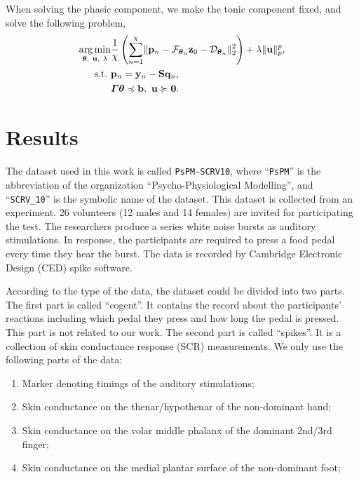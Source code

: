 \documentclass[10pt,conference]{ieeeconf}
\DeclareMathOperator*{\argmin}{arg\,min}
\begin{document}
When solving the phasic component, we make the tonic component fixed, and solve the following problem,
\begin{subequations} \label{fml:the:second-phasic}
  \renewcommand{\theequation}
  {\theparentequation-\arabic{equation}}
  \begin{align}
  \argmin\limits_{\boldsymbol{\theta},~\mathbf{u},~\lambda} & \frac{1}{\chi}  \left( \sum_{n=1}^{\chi} \lVert \mathbf{p}_n - \mathcal{F}_{\boldsymbol{\theta}_n} \mathbf{z}_{0} - \mathcal{D}_{\boldsymbol{\theta}_n} \rVert^2_2 \right) + \lambda \lVert \mathbf{u} \rVert_p^p, \\
  \mathrm{s.t.}~& \mathbf{p}_n = \mathbf{y}_n -  \mathbf{S} \mathbf{q}_n, \\
  & \boldsymbol{\Gamma} \boldsymbol{\theta} \preccurlyeq \mathbf{b},~ \mathbf{u} \succcurlyeq \mathbf{0}.
  \end{align}
\end{subequations}

\section{Results}

The dataset used in this work is called \texttt{PsPM-SCRV10}\cite{bach2014pspm}, where ``\texttt{PsPM}'' is the abbreviation of the organization ``Psycho-Physiological Modelling'', and ``\texttt{SCRV\_10}'' is the symbolic name of the dataset. This dataset is collected from an experiment. 26 volunteers (12 males and 14 females) are invited for participating the test. The researchers produce a series white noise bursts as auditory stimulations. In response, the participants are required to press a food pedal every time they hear the burst. The data is recorded by Cambridge Electronic Design (CED) spike software.

According to the type of the data, the dataset could be divided into two parts. The first part is called ``cogent''. It contains the record about the participants' reactions including which pedal they press and how long the pedal is pressed. This part is not related to our work. The second part is called ``spikes''. It is a collection of skin conductance response (SCR) measurements. We only use the following parts of the data:

\begin{enumerate}
  \item Marker denoting timings of the auditory stimulations;
  \item Skin conductance on the thenar/hypothenar of the non-dominant hand;
  \item Skin conductance on the volar middle phalanx of the dominant 2nd/3rd finger;
  \item Skin conductance on the medial plantar surface of the non-dominant foot;
\end{enumerate}
\end{document}
